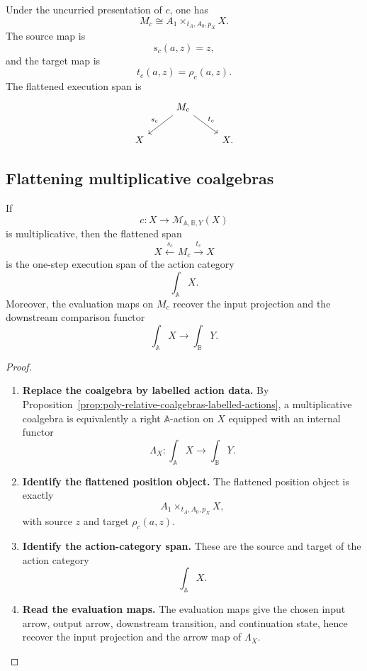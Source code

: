 Under the uncurried presentation of \(c\), one has
\[
M_c\cong A_1\times_{t_A,A_0,p_X}X.
\]
The source map is
\[
s_c(a,z)=z,
\]
and the target map is
\[
t_c(a,z)=\rho_c(a,z).
\]
The flattened execution span is
\[
\begin{tikzcd}
&
M_c
  \arrow[dl,"s_c"']
  \arrow[dr,"t_c"]
&
\\
X && X .
\end{tikzcd}
\]

\subsection{Flattening multiplicative coalgebras}
\label{subsec:poly-relative-flattening-multiplicative}

\begin{theorem}
\label{thm:poly-relative-flattening-multiplicative}
If
\[
c:X\to\mathcal M_{\mathbb A,\mathbb B,Y}(X)
\]
is multiplicative, then the flattened span
\[
X\xleftarrow{s_c}M_c\xrightarrow{t_c}X
\]
is the one-step execution span of the action category
\[
\int_{\mathbb A}X.
\]
Moreover, the evaluation maps on \(M_c\) recover the input projection and the
downstream comparison functor
\[
\int_{\mathbb A}X\to\int_{\mathbb B}Y.
\]
\end{theorem}

\begin{proof}
\leavevmode
\begin{enumerate}
\item \textbf{Replace the coalgebra by labelled action data.}
By Proposition~\ref{prop:poly-relative-coalgebras-labelled-actions}, a
multiplicative coalgebra is equivalently a right \(\mathbb A\)-action on
\(X\) equipped with an internal functor
\[
\Lambda_X:\int_{\mathbb A}X\to\int_{\mathbb B}Y.
\]

\item \textbf{Identify the flattened position object.}
The flattened position object is exactly
\[
A_1\times_{t_A,A_0,p_X}X,
\]
with source \(z\) and target \(\rho_c(a,z)\).

\item \textbf{Identify the action-category span.}
These are the source and target of the action category
\[
\int_{\mathbb A}X.
\]

\item \textbf{Read the evaluation maps.}
The evaluation maps give the chosen input arrow, output arrow, downstream
transition, and continuation state, hence recover the input projection and the
arrow map of \(\Lambda_X\).
\end{enumerate}
\end{proof}

